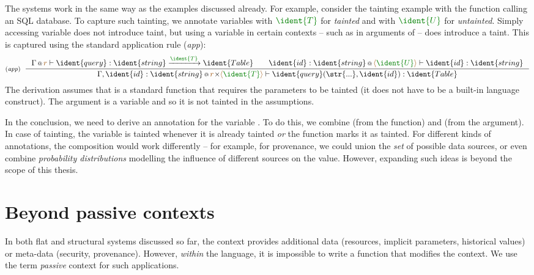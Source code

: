 The systems work in the same way as the examples discussed already. For example, consider the
tainting example with the  function calling an SQL database. To capture such 
tainting, we annotate variables with $\cclrd{\ident{T}}$ for \emph{tainted} and with 
$\cclrd{\ident{U}}$ for \emph{untainted}. Simply accessing variable does not introduce taint, 
but using a variable in certain contexts -- such as in arguments of  -- does introduce
a taint. This is captured using the standard application rule (\emph{app}):
%
\begin{equation*}
\tyrule{app}
  { \coctx{\Gamma}{\aclrd{r}} \vdash \ident{query} : \ident{string} \xrightarrow{\cclrd{\ident{T}}} \ident{Table} \qquad
    \coctx{\ident{id}:\ident{string}}{ \alift{\cclrd{\ident{U}}}} \vdash \ident{id} : \ident{string} }
  { \coctx{\Gamma, \ident{id}:\ident{string}}{ \aclrd{r} \cons \alift {\cclrd{\ident{T}}} \vdash \ident{query}(\str{...}, \ident{id}) : \ident{Table} } }
\end{equation*}
%
The derivation assumes that  is a standard function that requires the parameters
to be tainted (it does not have to be a built-in language construct). The argument is a 
variable and so it is not tainted in the assumptions.

In the conclusion, we need to derive an annotation for the variable . To do this, we
combine  (from the function) and  (from the argument). In case
of tainting, the variable is tainted whenever it is already tainted \emph{or} the function marks
it as tainted. For different kinds of annotations, the composition would work differently -- for
example, for provenance, we could union the \emph{set} of possible data sources, or even combine 
\emph{probability distributions} modelling the influence of different sources on the value.
However, expanding such ideas is beyond the scope of this thesis.


\section{Beyond passive contexts}

In both flat and structural systems discussed so far, the context provides additional data (resources, 
implicit parameters, historical values) or meta-data (security, provenance). However, \emph{within} 
the language, it is impossible to write a function that modifies the context. We use the term 
\emph{passive} context for such applications. 

